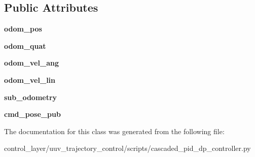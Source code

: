 \subsection*{Public Attributes}
\begin{DoxyCompactItemize}
\item 
\mbox{\label{classcascaded__pid__dp__controller_1_1ROV__CascadedController_a199ffc40ee1dbd1c6dadca20e0d690cd}} 
{\bfseries odom\+\_\+pos}
\item 
\mbox{\label{classcascaded__pid__dp__controller_1_1ROV__CascadedController_a348c0d5a74bde9ecf12928a4b38e8f02}} 
{\bfseries odom\+\_\+quat}
\item 
\mbox{\label{classcascaded__pid__dp__controller_1_1ROV__CascadedController_a2b73c018c5cb44a6e43aab5427b9df25}} 
{\bfseries odom\+\_\+vel\+\_\+ang}
\item 
\mbox{\label{classcascaded__pid__dp__controller_1_1ROV__CascadedController_a7c4a6de81e5194dd0de93a21ab8987f3}} 
{\bfseries odom\+\_\+vel\+\_\+lin}
\item 
\mbox{\label{classcascaded__pid__dp__controller_1_1ROV__CascadedController_ac98e7a59ce1f5879a4fd55c0e9fe4def}} 
{\bfseries sub\+\_\+odometry}
\item 
\mbox{\label{classcascaded__pid__dp__controller_1_1ROV__CascadedController_ae2a7f92e9366173d311c3d0e076f9f3b}} 
{\bfseries cmd\+\_\+pose\+\_\+pub}
\end{DoxyCompactItemize}


The documentation for this class was generated from the following file\+:\begin{DoxyCompactItemize}
\item 
control\+\_\+layer/uuv\+\_\+trajectory\+\_\+control/scripts/cascaded\+\_\+pid\+\_\+dp\+\_\+controller.\+py\end{DoxyCompactItemize}

